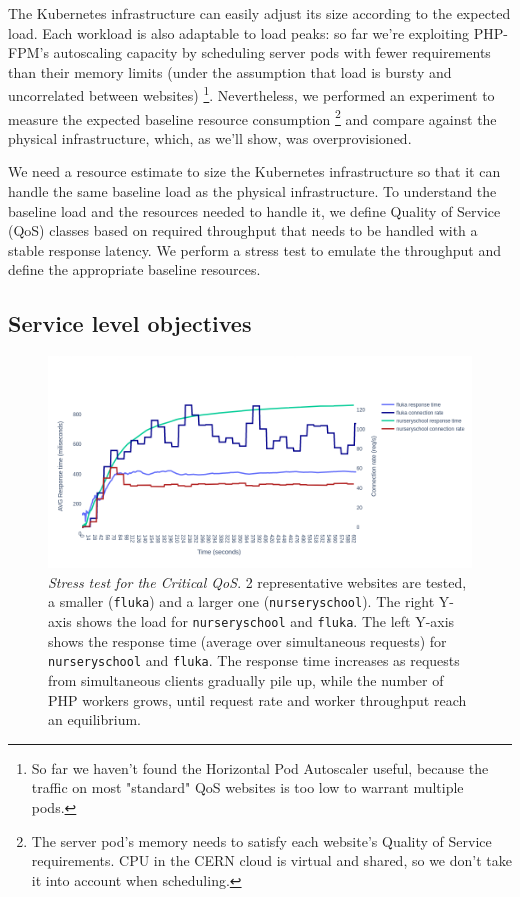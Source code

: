 The Kubernetes infrastructure can easily adjust its size according to the expected load.
Each workload is also adaptable to load peaks:
so far we're exploiting PHP-FPM's autoscaling capacity by scheduling server pods with fewer requirements than their memory limits
(under the assumption that load is bursty and uncorrelated between websites)
\footnote{So far we haven't found the Horizontal Pod Autoscaler useful, because the traffic on most "standard" QoS websites is too low to warrant multiple pods.}.
Nevertheless, we performed an experiment to measure the expected baseline resource consumption
\footnote{The server pod's memory needs to satisfy each website's Quality of Service requirements.
CPU in the CERN cloud is virtual and shared, so we don't take it into account when scheduling.}
and compare against the physical infrastructure, which, as we'll show, was overprovisioned.

We need a resource estimate to size the Kubernetes infrastructure so that it can handle the same baseline load as the physical infrastructure.
To understand the baseline load and the resources needed to handle it, we define Quality of Service (QoS) classes based on required throughput
that needs to be handled with a stable response latency.
We perform a stress test to emulate the throughput and define the appropriate baseline resources.

\subsection{Service level objectives}

\begin{figure}[t]
\centering
\captionsetup{justification=centering,margin=0.3cm}
\vspace{-2em}
\includegraphics[width=1.1\linewidth]{figures/experiment-figures/critical_run.png}
\caption{\emph{Stress test for the Critical QoS}.
2 representative websites are tested, a smaller (\texttt{fluka}) and a larger one (\texttt{nurseryschool}).
The right Y-axis shows the load for {\color[HTML]{b22222} \texttt{nurseryschool}} and {\color[HTML]{0000A0} \texttt{fluka}}.
The left Y-axis shows the response time (average over simultaneous requests) for {\color[HTML]{23CDCD} \texttt{nurseryschool}} and {\color[HTML]{636efa} \texttt{fluka}}.
The response time increases as requests from simultaneous clients gradually pile up, while the number of PHP workers grows, until request rate and worker throughput reach an equilibrium.}
\label{stress_usage}
\vspace{-2em}
\end{figure}

